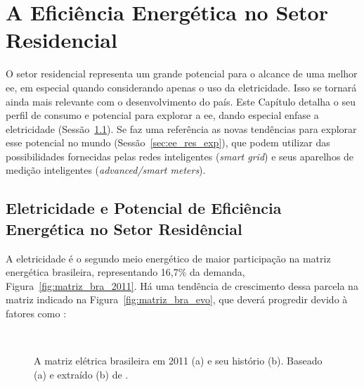 \chapter{A Eficiência Energética no Setor Residencial}
\label{chap:ee_retorno}

O setor residencial representa um grande potencial para o alcance de uma melhor
\gls{ee}, em especial quando considerando apenas o uso da eletricidade. Isso se
tornará ainda mais relevante com o desenvolvimento do país. Este Capítulo detalha
o seu perfil de consumo e potencial para explorar a \gls{ee}, dando 
especial enfase a eletricidade (Sessão~\ref{sec:ee_setor_residencial}). Se faz
uma referência as novas tendências para explorar esse potencial no
mundo (Sessão~\ref{sec:ee_res_exp}), que podem utilizar das possibilidades 
fornecidas pelas redes inteligentes (\emph{smart grid}) e seus aparelhos de 
medição inteligentes (\emph{advanced/smart meters}).

\section{Eletricidade e Potencial de Eficiência Energética 
no Setor Residêncial}
\label{sec:ee_setor_residencial}

A eletricidade é o segundo meio energético de maior participação na matriz 
energética brasileira, representando 16,7\% da demanda, 
Figura~\ref{fig:matriz_bra_2011}. 
Há uma tendência de crescimento dessa parcela na matriz indicado na 
Figura~\ref{fig:matriz_bra_evo}, que deverá progredir devido à fatores 
como \cite{iea_weo2010}:

\begin{figure}[h!t]
    \label{fig:eletricidade_brasil}
    \begin{center}
%
         \\ %
%
    \end{center}
    \caption[Matriz energética brasileira.]{A matriz elétrica brasileira
em 2011 (a) e seu histório (b). Baseado (a) e extraído (b) de \cite{ben2012}.}%
\end{figure}


